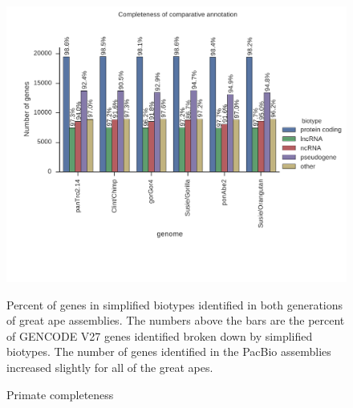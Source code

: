 \documentclass[fleqn,10pt]{wlscirep}
\begin{document}
\begin{figure}
\centering
\includegraphics[]{primate_completeness_old_and_new.pdf}
\caption{Primate completeness}
Percent of genes in simplified biotypes identified in both generations of great ape assemblies. The numbers above the bars are the percent of GENCODE V27 genes identified broken down by simplified biotypes. The number of genes identified in the PacBio assemblies increased slightly for all of the great apes.
\label{supp_fig:primate_completeness}
\end{figure}
\end{document}
